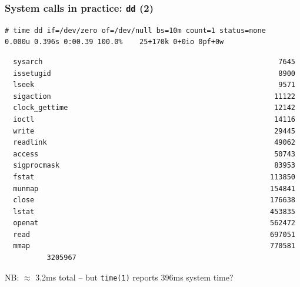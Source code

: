 \begin{frame}[fragile]
  \frametitle{System calls in practice: \texttt{dd} (2)}

  \begin{scriptsize}
\begin{verbatim}
# time dd if=/dev/zero of=/dev/null bs=10m count=1 status=none
0.000u 0.396s 0:00.39 100.0%    25+170k 0+0io 0pf+0w
\end{verbatim}
  \end{scriptsize}

  \pause

  \begin{scriptsize}
\begin{verbatim}
  sysarch                                                        7645
  issetugid                                                      8900
  lseek                                                          9571
  sigaction                                                     11122
  clock_gettime                                                 12142
  ioctl                                                         14116
  write                                                         29445
  readlink                                                      49062
  access                                                        50743
  sigprocmask                                                   83953
  fstat                                                        113850
  munmap                                                       154841
  close                                                        176638
  lstat                                                        453835
  openat                                                       562472
  read                                                         697051
  mmap                                                         770581
          3205967
\end{verbatim}
  \end{scriptsize}

  \pause

  NB: $\approx$ 3.2ms total -- but \texttt{time(1)} reports 396ms system time?
\end{frame}

